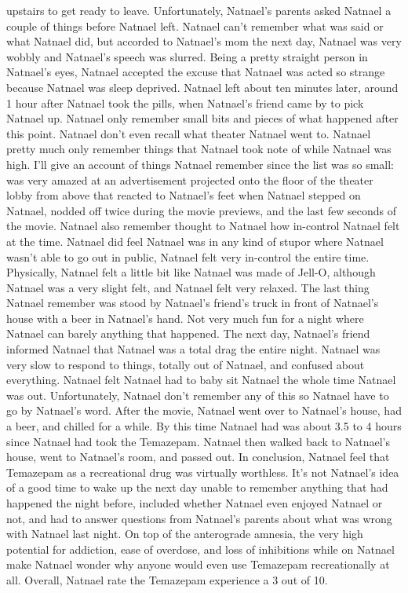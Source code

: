 \documentclass[12pt]{book}
\begin{document}
upstairs to get ready to leave. Unfortunately, Natnael's parents asked Natnael a couple of things before Natnael left. Natnael can't remember what was said or what Natnael did, but accorded to Natnael's mom the next day, Natnael was very wobbly and Natnael's speech was slurred. Being a pretty straight person in Natnael's eyes, Natnael accepted the excuse that Natnael was acted so strange because Natnael was sleep deprived. Natnael left about ten minutes later, around 1 hour after Natnael took the pills, when Natnael's friend came by to pick Natnael up. Natnael only remember small bits and pieces of what happened after this point. Natnael don't even recall what theater Natnael went to. Natnael pretty much only remember things that Natnael took note of while Natnael was high. I'll give an account of things Natnael remember since the list was so small: was very amazed at an advertisement projected onto the floor of the theater lobby from above that reacted to Natnael's feet when Natnael stepped on Natnael, nodded off twice during the movie previews, and the last few seconds of the movie. Natnael also remember thought to Natnael how in-control Natnael felt at the time. Natnael did feel Natnael was in any kind of stupor where Natnael wasn't able to go out in public, Natnael felt very in-control the entire time. Physically, Natnael felt a little bit like Natnael was made of Jell-O, although Natnael was a very slight felt, and Natnael felt very relaxed. The last thing Natnael remember was stood by Natnael's friend's truck in front of Natnael's house with a beer in Natnael's hand. Not very much fun for a night where Natnael can barely anything that happened. The next day, Natnael's friend informed Natnael that Natnael was a total drag the entire night. Natnael was very slow to respond to things, totally out of Natnael, and confused about everything. Natnael felt Natnael had to baby sit Natnael the whole time Natnael was out. Unfortunately, Natnael don't remember any of this so Natnael have to go by Natnael's word. After the movie, Natnael went over to Natnael's house, had a beer, and chilled for a while. By this time Natnael had was about 3.5 to 4 hours since Natnael had took the Temazepam. Natnael then walked back to Natnael's house, went to Natnael's room, and passed out. In conclusion, Natnael feel that Temazepam as a recreational drug was virtually worthless. It's not Natnael's idea of a good time to wake up the next day unable to remember anything that had happened the night before, included whether Natnael even enjoyed Natnael or not, and had to answer questions from Natnael's parents about what was wrong with Natnael last night. On top of the anterograde amnesia, the very high potential for addiction, ease of overdose, and loss of inhibitions while on Natnael make Natnael wonder why anyone would even use Temazepam recreationally at all. Overall, Natnael rate the Temazepam experience a 3 out of 10.
\end{document}
